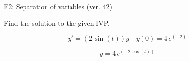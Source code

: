 \begin{exercise}
  \begin{exerciseTitle}F2: Separation of variables (ver. 42)\end{exerciseTitle}
  \begin{exerciseStatement}
    
Find the solution to the given IVP.

    
\[y'=( 2 \, \sin\left(t\right) )y\hspace{1em} y(0)= 4 \, e^{\left(-2\right)}\]

  \end{exerciseStatement}
  \begin{exerciseAnswer}
    
\[y= 4 \, e^{\left(-2 \, \cos\left(t\right)\right)}\]

  \end{exerciseAnswer}
\end{exercise}